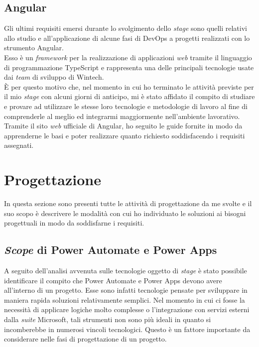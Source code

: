 \subsection{Angular}
Gli ultimi requisiti emersi durante lo svolgimento dello \emph{stage} sono quelli relativi allo studio e all'applicazione di alcune fasi di \gls{DevOps} a progetti realizzati con lo strumento Angular.\\
Esso è un \emph{framework} per la realizzazione di applicazioni \emph{web} tramite il linguaggio di programmazione TypeScript e rappresenta una delle principali tecnologie usate dai \emph{team} di sviluppo di Wintech.\\
È per questo motivo che, nel momento in cui ho terminato le attività previste per il mio \emph{stage} con alcuni giorni di anticipo, mi è stato affidato il compito di studiare e provare ad utilizzare le stesse loro tecnologie e metodologie di lavoro al fine di comprenderle al meglio ed integrarmi maggiormente nell'ambiente lavorativo.\\
Tramite il sito \emph{web} ufficiale di Angular, ho seguito le guide fornite in modo da apprenderne le basi e poter realizzare quanto richiesto soddisfacendo i requisiti assegnati.\\

\section{Progettazione}
In questa sezione sono presenti tutte le attività di progettazione da me svolte e il suo scopo è descrivere le modalità con cui ho individuato le soluzioni ai bisogni progettuali in modo da soddisfarne i requisiti.
\subsection{\emph{Scope} di Power Automate e Power Apps}
A seguito dell'analisi avvenuta sulle tecnologie oggetto di \emph{stage} è stato possibile identificare il compito che Power Automate e Power Apps devono avere all'interno di un progetto. 
Esse sono infatti tecnologie pensate per sviluppare in maniera rapida soluzioni relativamente semplici. Nel momento in cui ci fosse la necessità di applicare logiche molto complesse o l'integrazione con servizi esterni dalla \emph{suite} Microsoft, tali strumenti non sono più ideali in quanto si incomberebbe in numerosi vincoli tecnologici.
Questo è un fattore importante da considerare nelle fasi di progettazione di un progetto.\\

